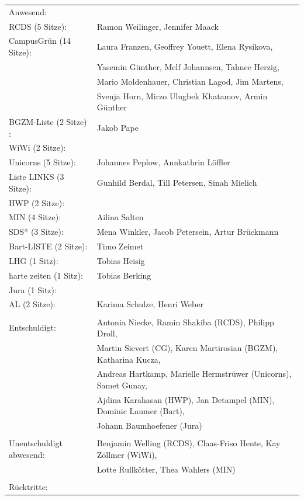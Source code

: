 \documentclass[ngerman,headheight=70pt]{scrartcl}
\begin{document}
    \begin{tabular}{ll}
        Anwesend: & \\
             RCDS (5 Sitze): & Ramon Weilinger, Jennifer Maack \\
             CampusGrün (14 Sitze): & Laura Franzen, Geoffrey Youett, Elena Rysikova, \\
                                   & Yasemin Günther, Melf Johannsen, Tahnee Herzig, \\
                                   & Mario Moldenhauer, Christian Lagod, Jim Martens,\\
                                   & Svenja Horn, Mirzo Ulugbek Khatamov, Armin Günther \\
             BGZM-Liste (2 Sitze) : & Jakob Pape \\
             WiWi (2 Sitze): &  \\
             Unicorns (5 Sitze): & Johannes Peplow, Annkathrin Löffler \\
             Liste LINKS (3 Sitze): & Gunhild Berdal, Till Petersen, Sinah Mielich \\
             HWP (2 Sitze): &  \\
             MIN (4 Sitze): & Ailina Salten \\
             SDS* (3 Sitze): & Mena Winkler, Jacob Petersein, Artur Brückmann \\
             Bart-LISTE (2 Sitze): & Timo Zeimet \\
             LHG (1 Sitz):  & Tobias Heisig \\
             harte zeiten (1 Sitz): & Tobias Berking \\
             Jura (1 Sitz): & \\
             AL (2 Sitze): & Karima Schulze, Henri Weber \\
            & \\
        Entschuldigt: & Antonia Niecke, Ramin Shakiba (RCDS), Philipp Droll, \\
                      & Martin Sievert (CG), Karen Martirosian (BGZM), Katharina Kucza, \\
                      & Andreas Hartkamp, Marielle Hermstrüwer (Unicorns), Samet Gunay, \\
                      & Ajdina Karahasan (HWP), Jan Detampel (MIN), Dominic Laumer (Bart),\\
                      & Johann Baumhoefener (Jura) \\
                      &\\
        Unentschuldigt abwesend: & Benjamin Welling (RCDS), Claas-Friso Hente, Kay Zöllmer (WiWi), \\
                                 & Lotte Rullkötter, Thea Wahlers (MIN) \\
                                 &\\
        Rücktritte: & \\
    \end{tabular}
\end{document}
